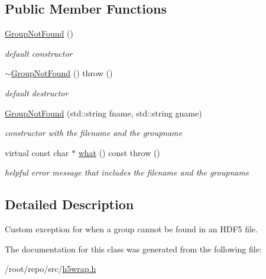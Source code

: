 \subsection*{Public Member Functions}
\begin{DoxyCompactItemize}
\item 
\mbox{\label{classh5wrap_1_1_group_not_found_accc7d7bea9e86968335a46ee39d7d543}} 
\hyperlink{classh5wrap_1_1_group_not_found_accc7d7bea9e86968335a46ee39d7d543}{Group\+Not\+Found} ()
\begin{DoxyCompactList}\small\item\em default constructor \end{DoxyCompactList}\item 
\mbox{\label{classh5wrap_1_1_group_not_found_a79dea7d1d5e3ffd7a7e83b4a2636398a}} 
\hyperlink{classh5wrap_1_1_group_not_found_a79dea7d1d5e3ffd7a7e83b4a2636398a}{$\sim$\+Group\+Not\+Found} ()  throw ()
\begin{DoxyCompactList}\small\item\em default destructor \end{DoxyCompactList}\item 
\mbox{\label{classh5wrap_1_1_group_not_found_a74f7e8f6efcf33503f5fec62eead40c3}} 
\hyperlink{classh5wrap_1_1_group_not_found_a74f7e8f6efcf33503f5fec62eead40c3}{Group\+Not\+Found} (std\+::string fname, std\+::string gname)
\begin{DoxyCompactList}\small\item\em constructor with the filename and the groupname \end{DoxyCompactList}\item 
\mbox{\label{classh5wrap_1_1_group_not_found_a65549c040e732b05a83c3791d9b351d9}} 
virtual const char $\ast$ \hyperlink{classh5wrap_1_1_group_not_found_a65549c040e732b05a83c3791d9b351d9}{what} () const  throw ()
\begin{DoxyCompactList}\small\item\em helpful error message that includes the filename and the groupname \end{DoxyCompactList}\end{DoxyCompactItemize}


\subsection{Detailed Description}
Custom exception for when a group cannot be found in an H\+D\+F5 file. 

The documentation for this class was generated from the following file\+:\begin{DoxyCompactItemize}
\item 
/root/repo/src/\hyperlink{h5wrap_8h}{h5wrap.\+h}\end{DoxyCompactItemize}
